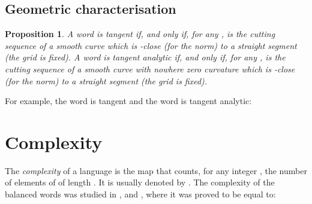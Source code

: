 \documentclass[preliminary]{eptcs}
\newtheorem{proposition}[Theorem]{Proposition}
\begin{document}
\subsection{Geometric characterisation}
\begin{proposition}
A word  is tangent if, and only if, for any ,  is
the cutting sequence of a smooth curve  which is
-close (for the  norm) to a straight segment (the grid
is fixed).
\newline
A word  is tangent analytic if, and only if, for any ,
 is the cutting sequence of a smooth curve  with nowhere zero
curvature which is -close (for the  norm) to a straight
segment (the grid is fixed).\\
\end{proposition}
For example, the word  is tangent and the word  is
tangent analytic:
\begin{center}
\end{center}





\section{Complexity}


The \emph{complexity} of a language  is the map that counts, for any
integer , the number of elements of  of length . It is usually
denoted by .
\newline
The complexity of the balanced words  was studied in
\cite{Lipatov1982}, \cite{Mignosi1991} and \cite{BerstelPocchiola1993},
where it was proved to be equal to:
\end{document}
